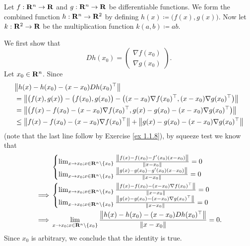 \begin{example}\label{6.4.2}
    Let \(f : \R^n \to \R\) and \(g : \R^n \to \R\) be differentiable functions.
    We form the combined function \(h : \R^n \to \R^2\) by defining \(h(x) \coloneqq \big(f(x), g(x)\big)\).
    Now let \(k : \R^2 \to \R\) be the multiplication function \(k(a, b) \coloneqq ab\).

    We first show that
    \[
        D h(x_0) = \begin{pmatrix}
            \nabla f(x_0) \\
            \nabla g(x_0)
        \end{pmatrix}.
    \]
    Let \(x_0 \in \R^n\).
    Since
    \begin{align*}
         & \norm*{h(x) - h(x_0) - (x - x_0) D h(x_0)^\top}                                                                                  \\
         & = \norm*{\big(f(x), g(x)\big) - \big(f(x_0), g(x_0)\big) - \big((x - x_0) \nabla f(x_0)^\top, (x - x_0) \nabla g(x_0)^\top\big)} \\
         & = \norm*{\big(f(x) - f(x_0) - (x - x_0) \nabla f(x_0)^\top, g(x) - g(x_0) - (x - x_0) \nabla g(x_0)^\top\big)}                   \\
         & \leq \norm*{f(x) - f(x_0) - (x - x_0) \nabla f(x_0)^\top} + \norm*{g(x) - g(x_0) - (x - x_0) \nabla g(x_0)^\top}
    \end{align*}
    (note that the last line follow by Exercise \ref{ex 1.1.8}),
    by squeeze test we know that
    \begin{align*}
                 & \begin{cases}
                       \lim_{x \to x_0 ; x \in \R^n \setminus \{x_0\}} \frac{\norm*{f(x) - f(x_0) - f'(x_0)(x - x_0)}}{\norm*{x - x_0}} = 0 \\
                       \lim_{x \to x_0 ; x \in \R^n \setminus \{x_0\}} \frac{\norm*{g(x) - g(x_0) - g'(x_0)(x - x_0)}}{\norm*{x - x_0}} = 0
                   \end{cases}                    \\
        \implies & \begin{cases}
                       \lim_{x \to x_0 ; x \in \R^n \setminus \{x_0\}} \frac{\norm*{f(x) - f(x_0) - (x - x_0) \nabla f(x_0)^\top}}{\norm*{x - x_0}} = 0 \\
                       \lim_{x \to x_0 ; x \in \R^n \setminus \{x_0\}} \frac{\norm*{g(x) - g(x_0) - (x - x_0) \nabla g(x_0)^\top}}{\norm*{x - x_0}} = 0
                   \end{cases}                    \\
        \implies & \lim_{x \to x_0 ; x \in \R^n \setminus \{x_0\}} \frac{\norm*{h(x) - h(x_0) - (x - x_0) D h(x_0)^\top}}{\norm*{x - x_0}} = 0.
    \end{align*}
    Since \(x_0\) is arbitrary, we conclude that the identity is true.


\end{example}
